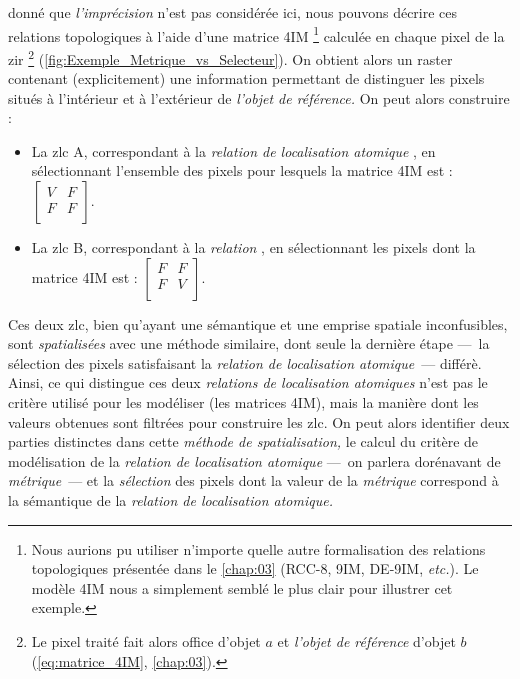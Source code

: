 donné que \emph{l'imprécision} n'est pas considérée ici, nous pouvons
décrire ces relations topologiques à l'aide d'une matrice 4IM
\footnote{Nous aurions pu utiliser n'importe quelle autre
  formalisation des relations topologiques présentée dans le
  \autoref{chap:03} (RCC-8, 9IM, DE-9IM, \emph{etc.}). Le modèle 4IM
  nous a simplement semblé le plus clair pour illustrer cet exemple.}
calculée en chaque pixel de la \ac{zir} \footnote{Le pixel traité fait
  alors office d'objet \(a\) et \emph{l'objet de référence} d'objet
  \(b\) (\autoref{eq:matrice_4IM}, \autoref{chap:03}).}
(\autoref{fig:Exemple_Metrique_vs_Selecteur}). On obtient alors un
raster contenant (explicitement) une information permettant de
distinguer les pixels situés à l'intérieur et à l'extérieur de
\emph{l'objet de référence.} On peut alors construire :
% 
\begin{itemize}
\item La \ac{zlc} \textcolor{RdBu-9-1}{\textsf{A}}, correspondant à la
  \emph{relation de localisation atomique}
  , en sélectionnant l'ensemble des pixels
  pour lesquels la matrice 4IM est :
  \(\left[\begin{smallmatrix}V&F\\F&F\\\end{smallmatrix}\right]\).
\item La \ac{zlc} \textcolor{RdBu-9-9}{\textsf{B}}, correspondant à la
  \emph{relation} , en sélectionnant les
  pixels dont la matrice 4IM est :
  \(\left[\begin{smallmatrix}F&F\\F&V\\\end{smallmatrix}\right]\).
\end{itemize}
%
Ces deux \ac{zlc}, bien qu'ayant une sémantique et une emprise
spatiale inconfusibles, sont \emph{spatialisées} avec une méthode
similaire, dont seule la dernière étape ---~la sélection des pixels
satisfaisant la \emph{relation de localisation atomique}~--- différè.
Ainsi, ce qui distingue ces deux \emph{relations de localisation
  atomiques} n'est pas le critère utilisé pour les modéliser (\ie les
matrices 4IM), mais la manière dont les valeurs obtenues sont filtrées
pour construire les \ac{zlc}. On peut alors identifier deux parties
distinctes dans cette \emph{méthode de spatialisation,} le calcul du
critère de modélisation de la \emph{relation de localisation atomique}
---~on parlera dorénavant de \emph{métrique}~--- et la
\emph{sélection} des pixels dont la valeur de la \emph{métrique}
correspond à la sémantique de la \emph{relation de localisation
  atomique.}

